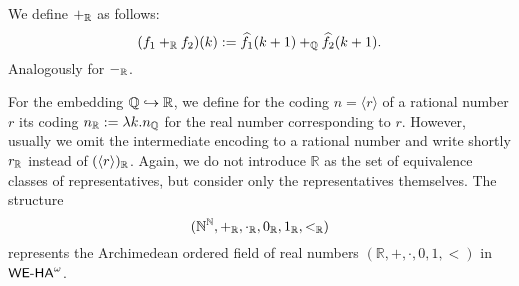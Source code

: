 \begin{dfn}\label{d:Rpm}
We define $+_{\mathbb{R}}$ as follows:
\[
( f_{1} +_{\mathbb{R}} f_{2}) (k): = \widehat{f_{1}}(k+1)
+_{\mathbb{Q}} \widehat{f_{2}}(k+1)
\text{.}
\]
Analogously for  $-_{\mathbb{R}}$.
\end{dfn}
For the embedding $\mathbb{Q}\hookrightarrow\mathbb{R}$, we define for the coding $n=\langle r\rangle$ of a rational number $r$
its coding $n_{\mathbb{R}} : = \lambda k. n_{\mathbb{Q}}$ for the real
number corresponding to $r$. However, usually we omit
the intermediate encoding to a rational number and write shortly $r_{\mathbb{R}}$ instead of $(\langle r\rangle)_{\mathbb{R}}$.
Again, we do not introduce $\mathbb{R}$ as the set of equivalence classes of
representatives, but consider only the representatives themselves. The structure
\[              
 (\mathbb{N}^{\mathbb{N}}, +_{\mathbb{R}},\cdot_{\mathbb{R}}, 0_{\mathbb{R}}, 1_{\mathbb{R}}, <_{\mathbb{R}})
\]
represents the Archimedean ordered field of real numbers $(\mathbb{R}, +, \cdot, 0, 1, <)$ in ${\textsf{\upshape WE-HA}}^{\omega}$. 
%
%
%
